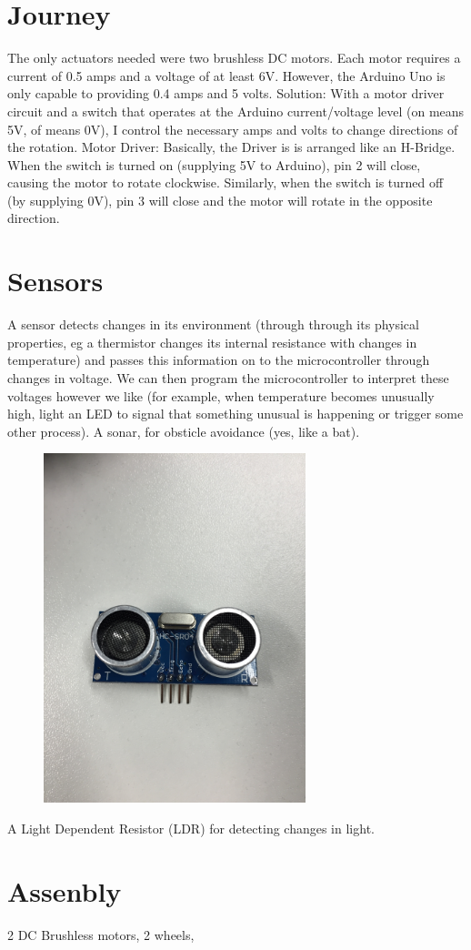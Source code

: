 \documentclass[final,3p,times,twocolumn]{elsarticle}
\begin{document}
\section{Journey}
The only actuators needed were two brushless DC motors.
Each motor requires a current of 0.5 amps and a voltage of at least 6V.
However, the Arduino Uno is only capable to providing 0.4 amps and 5 volts.
Solution:
With a motor driver circuit and a switch that operates at the Arduino current/voltage level (on means 5V, of means 0V),  I control the necessary amps and volts to change directions of the rotation.
Motor Driver:
Basically, the Driver is is arranged like an H-Bridge. When the switch is turned on (supplying 5V to Arduino), pin 2 will close, causing the motor to rotate clockwise. Similarly, when the switch is turned off (by supplying 0V), pin 3 will close and the motor will rotate in the opposite direction.

\section{Sensors}
A sensor detects changes in its environment (through through its physical properties, eg a thermistor changes its internal resistance with changes in temperature) and passes this information on to the microcontroller through changes in voltage.
We can then program the microcontroller to interpret these voltages however we like (for example, when temperature becomes unusually high, light an LED to signal that something unusual is happening or trigger some other process).
A sonar, for obsticle avoidance (yes, like a bat).
\begin{figure}[h!]
\includegraphics[trim={14cm 30cm 14cm 50cm}, clip, width=3in]{./media/Sonar.jpg}
\end{figure}
A Light Dependent Resistor (LDR) for detecting changes in light.

\section{Assenbly}
2 DC Brushless motors, 2 wheels, 
\end{document}

